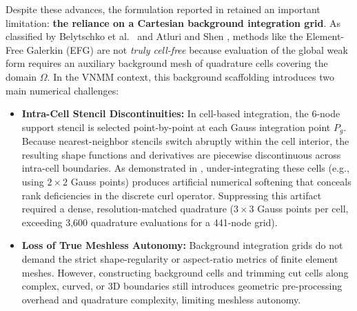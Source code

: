 \documentclass[VANCOUVER,Times1COL]{WileyNJD-v5}
\begin{document}
Despite these advances, the formulation reported in \cite{stable_vnmm2d_2026} retained an important limitation: \textbf{the reliance on a Cartesian background integration grid}. As classified by Belytschko et al.~\cite{belytschko1994element} and Atluri and Shen \cite{atluri2002meshless}, methods like the Element-Free Galerkin (EFG) are not \textit{truly cell-free} because evaluation of the global weak form requires an auxiliary background mesh of quadrature cells covering the domain $\Omega$. In the VNMM context, this background scaffolding introduces two main numerical challenges:
\begin{itemize}
    \item \textbf{Intra-Cell Stencil Discontinuities:} In cell-based integration, the 6-node support stencil is selected point-by-point at each Gauss integration point $P_g$. Because nearest-neighbor stencils switch abruptly within the cell interior, the resulting shape functions and derivatives are piecewise discontinuous across intra-cell boundaries. As demonstrated in \cite{stable_vnmm2d_2026}, under-integrating these cells (e.g., using $2 \times 2$ Gauss points) produces artificial numerical softening that conceals rank deficiencies in the discrete curl operator. Suppressing this artifact required a dense, resolution-matched quadrature ($3 \times 3$ Gauss points per cell, exceeding 3,600 quadrature evaluations for a 441-node grid).
    \item \textbf{Loss of True Meshless Autonomy:} Background integration grids do not demand the strict shape-regularity or aspect-ratio metrics of finite element meshes. However, constructing background cells and trimming cut cells along complex, curved, or 3D boundaries still introduces geometric pre-processing overhead and quadrature complexity, limiting meshless autonomy.
\end{itemize}
\end{document}
